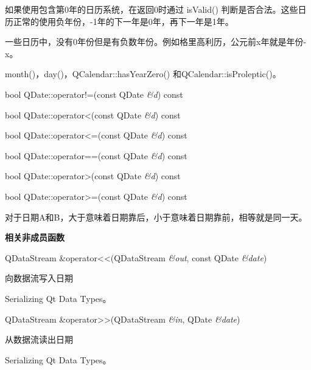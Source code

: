 如果使用包含第0年的日历系统，在返回0时通过 isValid() 判断是否合法。这些日历正常的使用负年份，-1年的下一年是0年，再下一年是1年。

一些日历中，没有0年份但是有负数年份。例如格里高利历，公元前x年就是年份-x。

\begin{notice}[另请参阅]
month()，day()，QCalendar::hasYearZero() 和QCalendar::isProleptic()。
\end{notice}



\splitLine

bool QDate::operator!=(const QDate \emph{\&d}) const

bool QDate::operator<(const QDate \emph{\&d}) const

bool QDate::operator<=(const QDate \emph{\&d}) const

bool QDate::operator==(const QDate \emph{\&d}) const

bool QDate::operator>(const QDate \emph{\&d}) const

bool QDate::operator>=(const QDate \emph{\&d}) const

对于日期A和B，大于意味着日期靠后，小于意味着日期靠前，相等就是同一天。

\splitLine

\textbf{相关非成员函数}

QDataStream \&operator<<(QDataStream \emph{\&out}, const QDate \emph{\&date})

向数据流写入日期

\begin{notice}[另请参阅]
Serializing Qt Data Types。
\end{notice}

QDataStream \&operator>>(QDataStream \emph{\&in}, QDate \emph{\&date})

从数据流读出日期

\begin{notice}[另请参阅]
Serializing Qt Data Types。
\end{notice}